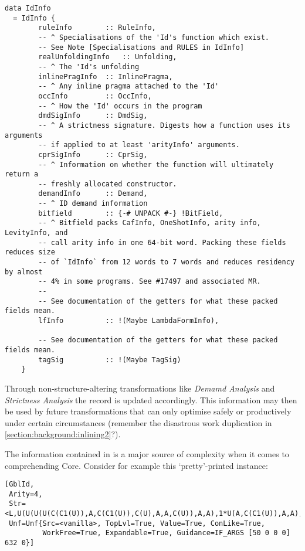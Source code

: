\begin{listing}[H]
\begin{verbatim}
data IdInfo
  = IdInfo {
        ruleInfo        :: RuleInfo,
        -- ^ Specialisations of the 'Id's function which exist.
        -- See Note [Specialisations and RULES in IdInfo]
        realUnfoldingInfo   :: Unfolding,
        -- ^ The 'Id's unfolding
        inlinePragInfo  :: InlinePragma,
        -- ^ Any inline pragma attached to the 'Id'
        occInfo         :: OccInfo,
        -- ^ How the 'Id' occurs in the program
        dmdSigInfo      :: DmdSig,
        -- ^ A strictness signature. Digests how a function uses its arguments
        -- if applied to at least 'arityInfo' arguments.
        cprSigInfo      :: CprSig,
        -- ^ Information on whether the function will ultimately return a
        -- freshly allocated constructor.
        demandInfo      :: Demand,
        -- ^ ID demand information
        bitfield        :: {-# UNPACK #-} !BitField,
        -- ^ Bitfield packs CafInfo, OneShotInfo, arity info, LevityInfo, and
        -- call arity info in one 64-bit word. Packing these fields reduces size
        -- of `IdInfo` from 12 words to 7 words and reduces residency by almost
        -- 4% in some programs. See #17497 and associated MR.
        --
        -- See documentation of the getters for what these packed fields mean.
        lfInfo          :: !(Maybe LambdaFormInfo),

        -- See documentation of the getters for what these packed fields mean.
        tagSig          :: !(Maybe TagSig)
    }
\end{verbatim}
\end{listing}

Through non-structure-altering transformations like \textit{Demamd Analysis} and \textit{Strictness Analysis} the 
record is updated accordingly. This information may then be used by future transformations that can only optimise safely or
productively under certain circumstances (remember the disastrous work duplication in \cref{section:background:inlining2}?).

The information contained in  is a major source of complexity when it comes to comprehending Core. Consider
for example this `pretty'-printed  instance:

\begin{listing}[H]
\begin{verbatim}
[GblId,
 Arity=4,
 Str=<L,U(U(U(U(C(C1(U)),A,C(C1(U)),C(U),A,A,C(U)),A,A),1*U(A,C(C1(U)),A,A),A,A,A,A,A),U(A,A,C(U),...etc.
 Unf=Unf{Src=<vanilla>, TopLvl=True, Value=True, ConLike=True,
         WorkFree=True, Expandable=True, Guidance=IF_ARGS [50 0 0 0] 632 0}]
\end{verbatim}
\end{listing}

